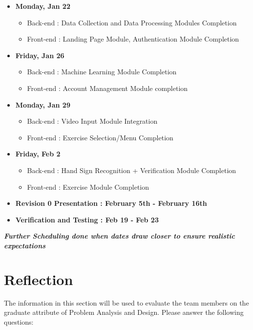 \documentclass[12pt, titlepage]{article}
\begin{document}
\begin{itemize}
    \item \textbf{Monday, Jan 22}
    \begin{itemize}
        \item Back-end  : Data Collection and Data Processing Modules Completion
        \item Front-end : Landing Page Module, Authentication Module Completion
    \end{itemize}
    \item \textbf{Friday, Jan 26}
    \begin{itemize}
        \item Back-end  : Machine Learning Module Completion
        \item Front-end : Account Management Module completion
    \end{itemize}
    \item \textbf{Monday, Jan 29}
    \begin{itemize}
        \item Back-end  : Video Input Module Integration
        \item Front-end : Exercise Selection/Menu Completion
    \end{itemize}
    \item \textbf{Friday, Feb 2}
    \begin{itemize}
        \item Back-end  : Hand Sign Recognition + Verification Module Completion
        \item Front-end : Exercise Module Completion
    \end{itemize}
    \item \textbf{Revision 0 Presentation : February 5th - February 16th}
    \item \textbf{Verification and Testing : Feb 19 - Feb 23}
\end{itemize}
\textbf{\textit{Further Scheduling done when dates draw closer to ensure realistic expectations}}

\section{Reflection}

The information in this section will be used to evaluate the team members on the
graduate attribute of Problem Analysis and Design.  Please answer the following questions:
\end{document}
